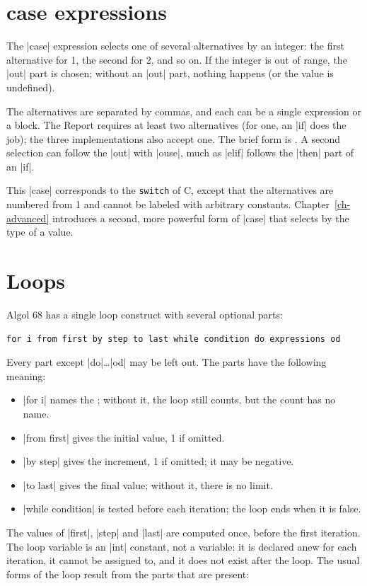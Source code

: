 \section{\textbf{case} expressions}\label{sec-case}

The \code|case| expression selects one of several alternatives by an
integer: the first alternative for 1, the second for 2, and so on. If the
integer is out of range, the \code|out| part is chosen; without an
\code|out| part, nothing happens (or the value is undefined).


The alternatives are separated by commas, and each can be a single
expression or a block. The Report requires at least two alternatives (for
one, an \code|if| does the job); the three implementations also accept
one. The brief form is . A second
selection can follow the \code|out| with \code|ouse|, much as \code|elif|
follows the \code|then| part of an \code|if|.

This \code|case| corresponds to the \texttt{switch} of C, except that the
alternatives are numbered from 1 and cannot be labeled with arbitrary
constants. Chapter~\ref{ch-advanced} introduces a second, more powerful form of
\code|case| that selects by the type of a value.

\section{Loops}\label{sec-loops}

Algol 68 has a single loop construct with several optional parts:
\begin{lstlisting}
for i from first by step to last while condition do expressions od
\end{lstlisting}
Every part except \code|do|\ldots\code|od| may be left out. The parts
have the following meaning:
\begin{itemize}
\item \code|for i| names the ; without it, the loop
  still counts, but the count has no name.
\item \code|from first| gives the initial value, 1 if omitted.
\item \code|by step| gives the increment, 1 if omitted; it may be
  negative.
\item \code|to last| gives the final value; without it, there is no limit.
\item \code|while condition| is tested before each iteration; the loop
  ends when it is false.
\end{itemize}
The values of \code|first|, \code|step| and \code|last| are computed once,
before the first iteration. The loop variable is an \code|int| constant,
not a variable: it is declared anew for each iteration, it cannot be
assigned to, and it does not exist after the loop. The usual forms of the
loop result from the parts that are present:

